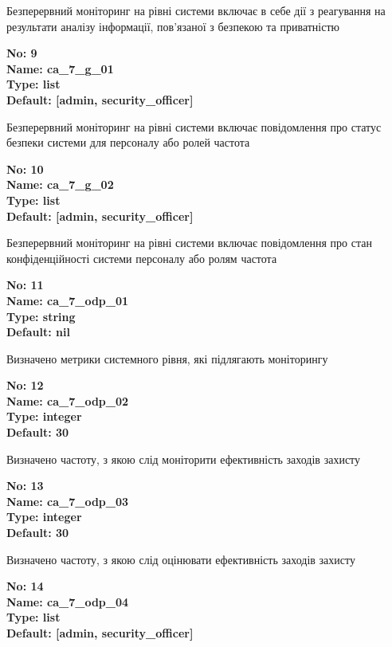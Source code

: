 \documentclass{article}
\begin{document}
{\footnotesize Безперервний моніторинг на рівні системи включає в себе дії з реагування на результати аналізу інформації, пов'язаної з безпекою та приватністю}


{\footnotesize\bfseries
No: 9\\
Name: ca\_\allowbreak{}7\_\allowbreak{}g\_\allowbreak{}01\\
Type: list\\
Default: [\textquotedbl{}admin\textquotedbl{}, \textquotedbl{}security\_\allowbreak{}officer\textquotedbl{}]
}

{\footnotesize Безперервний моніторинг на рівні системи включає повідомлення про статус безпеки системи для персоналу або ролей частота}


{\footnotesize\bfseries
No: 10\\
Name: ca\_\allowbreak{}7\_\allowbreak{}g\_\allowbreak{}02\\
Type: list\\
Default: [\textquotedbl{}admin\textquotedbl{}, \textquotedbl{}security\_\allowbreak{}officer\textquotedbl{}]
}

{\footnotesize Безперервний моніторинг на рівні системи включає повідомлення про стан конфіденційності системи персоналу або ролям частота}


{\footnotesize\bfseries
No: 11\\
Name: ca\_\allowbreak{}7\_\allowbreak{}odp\_\allowbreak{}01\\
Type: string\\
Default: nil
}

{\footnotesize Визначено метрики системного рівня, які підлягають моніторингу}


{\footnotesize\bfseries
No: 12\\
Name: ca\_\allowbreak{}7\_\allowbreak{}odp\_\allowbreak{}02\\
Type: integer\\
Default: 30
}

{\footnotesize Визначено частоту, з якою слід моніторити ефективність заходів захисту}


{\footnotesize\bfseries
No: 13\\
Name: ca\_\allowbreak{}7\_\allowbreak{}odp\_\allowbreak{}03\\
Type: integer\\
Default: 30
}

{\footnotesize Визначено частоту, з якою слід оцінювати ефективність заходів захисту}


{\footnotesize\bfseries
No: 14\\
Name: ca\_\allowbreak{}7\_\allowbreak{}odp\_\allowbreak{}04\\
Type: list\\
Default: [\textquotedbl{}admin\textquotedbl{}, \textquotedbl{}security\_\allowbreak{}officer\textquotedbl{}]
}
\end{document}
